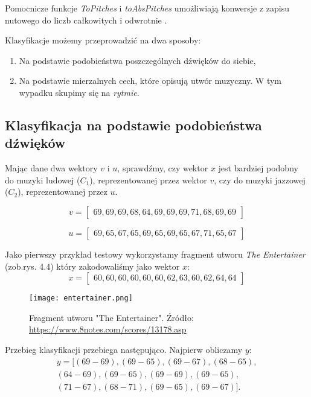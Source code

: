 Pomocnicze funkcje \textit{ToPitches} i \textit{toAbsPitches} umożliwiają konwersje z  zapisu nutowego do liczb całkowitych i odwrotnie \citep[s. 60]{HSOM_2018}.

Klasyfikacje możemy przeprowadzić na dwa sposoby:
\begin{enumerate}
    \item Na podstawie podobieństwa poszczególnych dźwięków do siebie,
    \item Na podstawie mierzalnych cech, które opisują utwór muzyczny. W tym wypadku skupimy się na \textit{rytmie}.
\end{enumerate}

\subsection{Klasyfikacja na podstawie podobieństwa dźwięków}
Mając dane dwa wektory $v$ i $u$, sprawdźmy, czy wektor $x$ jest bardziej podobny do muzyki ludowej ($C_{1}$), reprezentowanej przez wektor $v$, czy do muzyki jazzowej ($C_{2}$), reprezentowanej przez $u$. 

\begin{equation*}
v =
\begin{bmatrix}
69,69,69,68,64,69,69,69,71,68,69,69
\end{bmatrix}
\end{equation*}

\begin{equation*}
    u =
    \begin{bmatrix}
    69,65,67,65,69,65,69,65,67,71,65,67
    \end{bmatrix}
\end{equation*}

Jako pierwszy przykład testowy wykorzystamy fragment utworu \textit{The Entertainer} (zob.rys. 4.4) który zakodowaliśmy jako wektor $x$:
\begin{equation*}
x =
    \begin{bmatrix}
   60,60,60,60,60,60,62,63,60,62,64,64
    \end{bmatrix}
\end{equation*}

\begin{figure}[H]
\texttt{[image: entertainer.png]}
\centering
\caption{Fragment utworu "The Entertainer". Źródło: \url{https://www.8notes.com/scores/13178.asp}}
\centering
\end{figure}

Przebieg klasyfikacji przebiega następująco. Najpierw obliczamy $y$:
\begin{align*}
y = [(69 - 69), (69 - 65), (69 - 67), (68 - 65), \\ (64 - 69), 
(69 - 65), (69 - 69), (69 - 65),\\ (71 - 67), (68 - 71), (69 - 65), (69 - 67)].
\end{align*}

